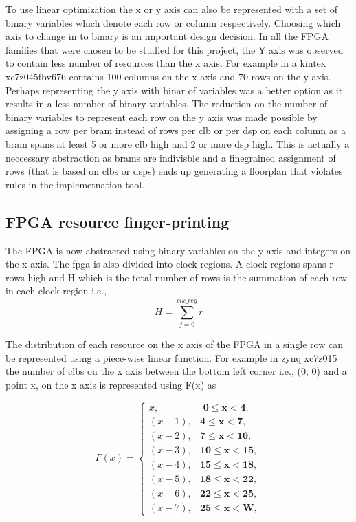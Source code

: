 \documentclass[conference]{IEEEtran}
\begin{document}
To use linear optimization the x or y axis can also be represented with a set of binary variables which denote each row or column respectively. Choosing which axis to change in to binary is an important design decision. In all the FPGA families that were chosen to be studied for this project, the Y axis was observed to contain less number of resources than the x axis. For example in a kintex xc7z045fbv676 contains 100 columns on the x axis and 70 rows on the y axis. Perhaps representing the y axis with binar of variables was a better option as it results in a less number of binary variables. The reduction on the number of binary variables to represent each row on the y axis was made possible by assigning a row per bram instead of rows per clb or per dsp on each column as a bram spans at least 5 or more clb high and 2 or more dsp high. This is actually a neccessary abstraction as brams are indivisble and a finegrained assignment of rows (that is based on clbs or dsps) ends up generating a floorplan that violates rules in the implemetnation tool. \\

\subsection{FPGA resource finger-printing}
The FPGA is now abstracted using binary variables on the y axis and integers on the x axis. The fpga is also divided into clock regions. A clock regions spans r rows high and H which is the total number of rows is the summation of each row in each clock region i.e.,  
\begin{equation}
H = \sum_{j=0}^{clk\_reg} r
\end{equation}

The distribution of each resource on the x axis of the FPGA in a single row can be represented using a piece-wise linear function. For example in zynq xc7z015 the number of clbs on the x axis between the bottom left corner i.e., (0, 0) and a point x, on the x axis is represented using F(x) as  

\begin{equation}
F(x) = \begin{cases}
x, & \textbf{ 0$\leq$x$<$4}, \\
(x-1), & \textbf{4$\leq$x$<$7}, \\
(x-2), & \textbf{7$\leq$x$<$10}, \\
(x-3), & \textbf{10$\leq$x$<$15}, \\
(x-4), & \textbf{15$\leq$x$<$18}, \\
(x-5), & \textbf{18$\leq$x$<$22}, \\
(x-6), & \textbf{22$\leq$x$<$25}, \\
(x-7), & \textbf{25$\leq$x$<$W},
\end{cases}
\end{equation}
\end{document}
